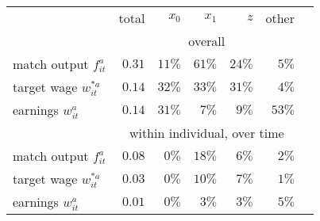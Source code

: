 \begin{tabular}{l r r r r r r} 
\toprule 
 & total & $x_0$ & $x_1$ & $z$ & other\\[4pt]
 & \multicolumn{5}{c}{overall}\\[-3pt]
 \cmidrule(lr){2-6}
match output $f^a_{it}$ & $0.31$ & $11\%$ & $61\%$ & $24\%$ & $5\%$\\
target wage $w^{*a}_{it}$ & $0.14$ & $32\%$ & $33\%$ & $31\%$ & $4\%$\\
earnings $w^a_{it}$ & $0.14$ & $31\%$ & $7\%$ & $9\%$ & $53\%$\\[5pt]
 & \multicolumn{5}{c}{within individual, over time}\\[-3pt]
 \cmidrule(lr){2-6}
match output $f^a_{it}$ & $0.08$ & $0\%$ & $18\%$ & $6\%$ & $2\%$\\
target wage $w^{*a}_{it}$ & $0.03$ & $0\%$ & $10\%$ & $7\%$ & $1\%$\\
earnings $w^a_{it}$ & $0.01$ & $0\%$ & $3\%$ & $3\%$ & $5\%$\\
\bottomrule 
\end{tabular}

